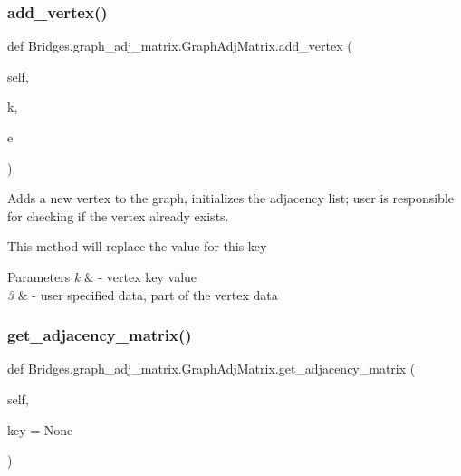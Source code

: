 \subsubsection{\texorpdfstring{add\+\_\+vertex()}{add\_vertex()}}
{\footnotesize\ttfamily def Bridges.\+graph\+\_\+adj\+\_\+matrix.\+Graph\+Adj\+Matrix.\+add\+\_\+vertex (\begin{DoxyParamCaption}\item[{}]{self,  }\item[{}]{k,  }\item[{}]{e }\end{DoxyParamCaption})}



Adds a new vertex to the graph, initializes the adjacency list; user is responsible for checking if the vertex already exists. 

This method will replace the value for this key


\begin{DoxyParams}{Parameters}
{\em k} & -\/ vertex key value \\
\hline
{\em 3} & -\/ user specified data, part of the vertex data \\
\hline
\end{DoxyParams}
\mbox{\label{class_bridges_1_1graph__adj__matrix_1_1_graph_adj_matrix_a806ce01dd58eb4951ce681e39e2bc484}} 
\subsubsection{\texorpdfstring{get\+\_\+adjacency\+\_\+matrix()}{get\_adjacency\_matrix()}}
{\footnotesize\ttfamily def Bridges.\+graph\+\_\+adj\+\_\+matrix.\+Graph\+Adj\+Matrix.\+get\+\_\+adjacency\+\_\+matrix (\begin{DoxyParamCaption}\item[{}]{self,  }\item[{}]{key = {\ttfamily None} }\end{DoxyParamCaption})}



